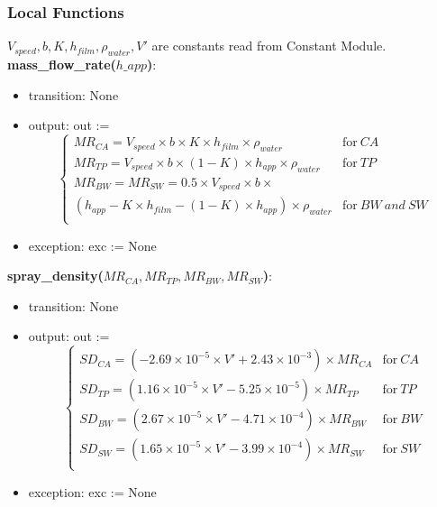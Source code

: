 \documentclass[12pt, titlepage]{article}
\begin{document}
\subsubsection{Local Functions}
$V_{speed}, b, K, h_{film}, \rho_{water}, V'$ are constants read from Constant Module.\\
\noindent \textbf{mass\_flow\_rate($h\_app$)}:
\begin{itemize}
\item transition: None
\item output: out := \begin{equation}
     \begin{cases}
     \mathit{MR_{CA}} = V_{speed} \times b \times K \times h_{film} \times \rho_{water} & \text{for} ~ CA \\
      \mathit{MR_{TP}} = V_{speed} \times b \times (1-K) \times h_{app} \times \rho_{water} & \text{for} ~ TP\\
      \mathit{MR_{BW}} = \mathit{MR_{SW}} = 0.5 \times V_{speed} \times b \times \\ (h_{app} - K \times h_{film} - (1-K) \times h_{app}) \times \rho_{water} & \text{for} ~ BW ~ and~ SW \\
      \end{cases}\nonumber
  \end{equation}
  
\item exception: exc := None
\end{itemize}
\noindent \textbf{spray\_density($\mathit{MR_{CA}}, \mathit{MR_{TP}}, \mathit{MR_{BW}}, \mathit{MR_{SW}}$)}:
\begin{itemize}
\item transition: None
\item output: out := 
\begin{equation}
     \begin{cases}
     \mathit{SD_{CA}} = (-2.69 \times 10^{-5} \times V' + 2.43 \times 10^{-3}) \times \mathit{MR_{CA}} & \text{for} ~ CA \\
      \mathit{SD_{TP}} = (1.16 \times 10^{-5} \times V' - 5.25 \times 10^{-5}) \times \mathit{MR_{TP}} & \text{for} ~ TP\\      
      \mathit{SD_{BW}} = (2.67 \times 10^{-5} \times V' - 4.71 \times 10^{-4}) \times \mathit{MR_{BW}} & \text{for} ~ BW\\
       \mathit{SD_{SW}} = (1.65 \times 10^{-5} \times V' - 3.99 \times 10^{-4}) \times \mathit{MR_{SW}} & \text{for} ~ SW\\      
      \end{cases}\nonumber
  \end{equation}
\item exception: exc := None
\end{itemize}
\end{document}
